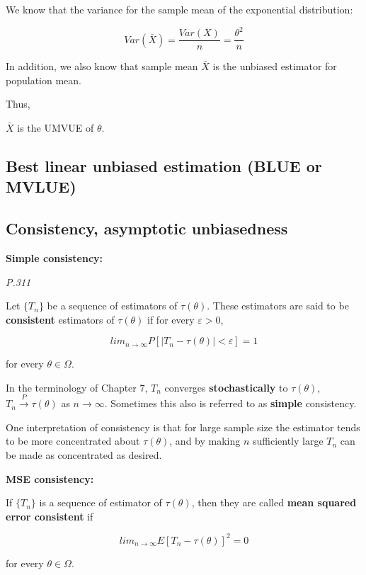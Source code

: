 \documentclass[]{book}
\begin{document}
We know that the variance for the sample mean of the exponential distribution:

\[Var(\bar{X})=\frac{Var(X)}{n}=\frac{\theta^2}{n}\]

In addition, we also know that sample mean \(\bar{X}\) is the unbiased estimator for population mean.

Thus,

\(\bar{X}\) is the UMVUE of \(\theta\).

\hypertarget{best-linear-unbiased-estimation-blue-or-mvlue}{%
\subsection{Best linear unbiased estimation (BLUE or MVLUE)}\label{best-linear-unbiased-estimation-blue-or-mvlue}}

\hypertarget{consistency-asymptotic-unbiasedness}{%
\subsection{Consistency, asymptotic unbiasedness}\label{consistency-asymptotic-unbiasedness}}

\textbf{Simple consistency:}

\emph{P.311}

Let \(\{T_n\}\) be a sequence of estimators of \(\tau(\theta)\). These estimators are said to be \textbf{consistent} estimators of \(\tau(\theta)\) if for every \(\varepsilon >0\),

\[lim_{n\rightarrow \infty}P[|T_n-\tau(\theta)|<\varepsilon]=1\]

for every \(\theta \in \Omega\).

In the terminology of Chapter 7, \(T_n\) converges \textbf{stochastically} to \(\tau(\theta)\), \(T_n \xrightarrow{P} \tau(\theta)\) as \(n \rightarrow \infty\). Sometimes this also is referred to as \textbf{simple} consistency.

One interpretation of consistency is that for large sample size the estimator tends to be more concentrated about \(\tau(\theta)\), and by making \(n\) sufficiently large \(T_n\) can be made as concentrated as desired.

\textbf{MSE consistency:}

If \(\{ T_n \}\) is a sequence of estimator of \(\tau(\theta)\), then they are called \textbf{mean squared error consistent} if

\[lim_{n\rightarrow \infty} E[T_n - \tau(\theta)]^2=0\]

for every \(\theta \in \Omega\).
\end{document}
